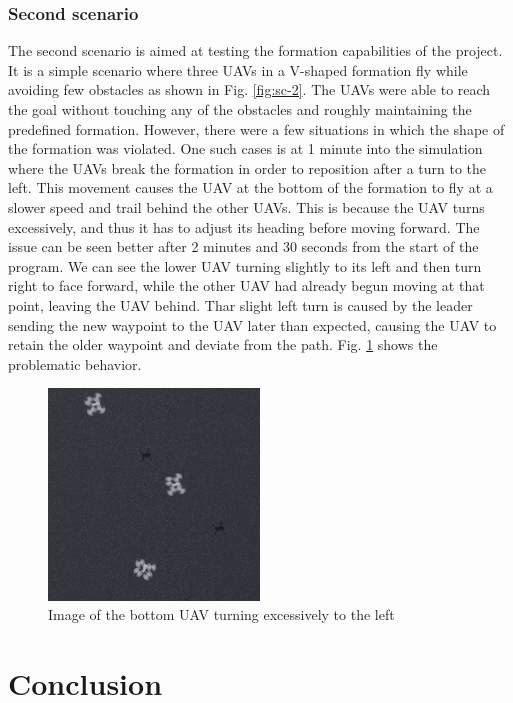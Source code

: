 \subsection{Second scenario}

The second scenario is aimed at testing the formation capabilities of the project. It is a simple scenario where
three UAVs in a V-shaped formation fly while avoiding few obstacles as shown in Fig. \ref{fig:sc-2}. The UAVs
were able to reach the goal without touching any of the obstacles and roughly maintaining the predefined formation.
However, there were a few situations in which the shape of the formation was violated. One such cases is at 1 minute
into the simulation where the UAVs break the formation in order to reposition after a turn to the left. This movement
causes the UAV at the bottom of the formation to fly at a slower speed and trail behind the other UAVs. This is because
the UAV turns excessively, and thus it has to adjust its heading before moving forward. The issue can be seen better after 2 minutes
and 30 seconds from the start of the program. We can see the lower UAV turning slightly to its left and then turn right to 
face forward, while the other UAV had already begun moving at that point, leaving the UAV behind. Thar slight left turn is caused
by the leader sending the new waypoint to the UAV later than expected, causing the UAV to retain the older waypoint and deviate from 
the path. Fig. \ref{fig:drift} shows the problematic behavior.

\begin{figure}
	\begin{center}
		\includegraphics[width=0.5\textwidth]{./img/drift.png}
	\end{center}
	\caption{Image of the bottom UAV turning excessively to the left}\label{fig:drift}
\end{figure}


\chapter{Conclusion}

